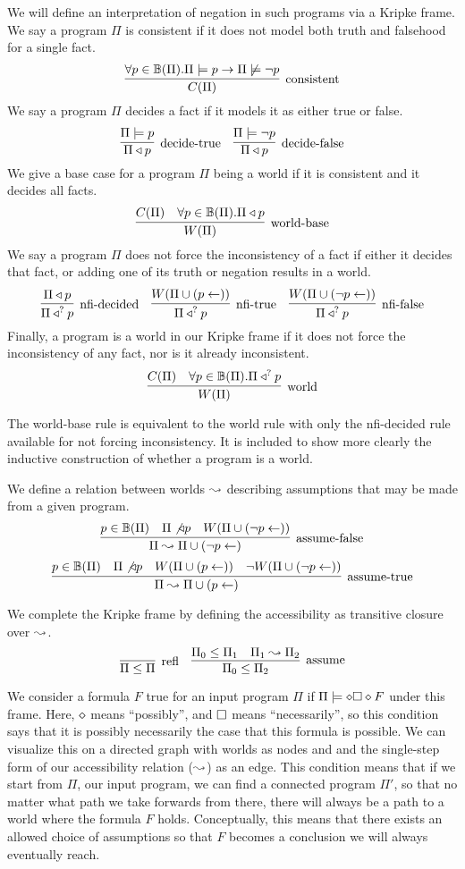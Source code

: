 We will define an interpretation of negation in such programs via a Kripke frame.
We say a program $\Pi$ is consistent if it does not model both truth and falsehood for a single fact.
\[
	\infer[\textrm{consistent}]{\cons{\Pi}}{\forall p \in \hb(\Pi). \Pi \models p \imp \Pi \not \models \neg p}
\]
We say a program $\Pi$ decides a fact if it models it as either true or false.
\[
	\infer[\textrm{decide-true}]{\Pi \decides p}{\Pi \models p}
	\quad
	\infer[\textrm{decide-false}]{\Pi \decides p}{\Pi \models \neg p}
\]
We give a base case for a program $\Pi$ being a world if it is consistent and it decides all facts.
\[
	\infer[\textrm{world-base}]{W(\Pi)}{C(\Pi) & \forall p \in \hb(\Pi). \Pi \decides p}
\]
We say a program $\Pi$ does not force the inconsistency of a fact if either it decides that fact, or adding one of its truth or negation results in a world.
\[
	\infer[\textrm{nfi-decided}]{\nfi{\Pi}{p}}{\Pi \decides p}
	\quad
	\infer[\textrm{nfi-true}]{\nfi{\Pi}{p}}{\world{\Pi \cup (p \leftarrow)}}
	\quad
	\infer[\textrm{nfi-false}]{\nfi{\Pi}{p}}{\world{\Pi \cup (\neg p \leftarrow)}}
\]
Finally, a program is a world in our Kripke frame if it does not force the inconsistency of any fact, nor is it already inconsistent.
\[
	\infer[\textrm{world}]{\world{\Pi}}{\cons{\Pi} & \forall p \in \hb(\Pi). \nfi{\Pi}{p}}
\]

The world-base rule is equivalent to the world rule with only the nfi-decided rule available for not forcing inconsistency.
It is included to show more clearly the inductive construction of whether a program is a world.

We define a relation between worlds $\leadsto$ describing assumptions that may be made from a given program.
\[
	\infer[\textrm{assume-false}]{\Pi \stepass \Pi \cup (\neg p \leftarrow)}{p \in \hb(\Pi) & \Pi \not \decides p & \world{\Pi \cup (\neg p \leftarrow)}}
\]
\[
	\infer[\textrm{assume-true}]{\Pi \stepass \Pi \cup (p \leftarrow)}{p \in \hb(\Pi) & \Pi \not \decides p & \world{\Pi \cup (p \leftarrow)} & \neg \world{\Pi \cup (\neg p \leftarrow)}}
\]

We complete the Kripke frame by defining the accessibility as transitive closure over $\leadsto$.
\[
	\infer[\textrm{refl}]{\Pi \leq \Pi}{}
	\quad
	\infer[\textrm{assume}]{\Pi_0 \leq \Pi_2}{\Pi_0 \leq \Pi_1 & \Pi_1 \stepass \Pi_2}
\]

We consider a formula $F$ true for an input program $\Pi$ if $\Pi \models \diamond \square \diamond F$ under this frame.
Here, $\diamond$ means ``possibly'', and $\square$ means ``necessarily'', so this condition says that it is possibly necessarily the case that this formula is possible.
We can visualize this on a directed graph with worlds as nodes and and the single-step form of our accessibility relation ($\leadsto$) as an edge.
This condition means that if we start from $\Pi$, our input program, we can find a connected program $\Pi'$, so that no matter what path we take forwards from there, there will always be a path to a world where the formula $F$ holds.
Conceptually, this means that there exists an allowed choice of assumptions so that $F$ becomes a conclusion we will always eventually reach.

